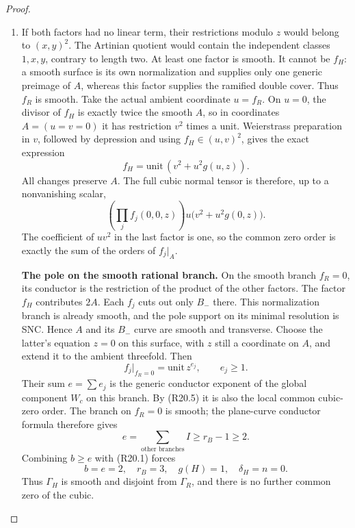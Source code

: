 \begin{proof}
\begin{enumerate}[label={$\langle1\rangle$\arabic*.},leftmargin=*]
\item If both factors had no linear term, their
restrictions modulo $z$ would belong to
$(x,y)^2$. The Artinian quotient would contain
the independent classes $1,x,y$, contrary to
length two. At least one factor is smooth.
It cannot be $f_H$: a smooth surface is its own
normalization and supplies only one generic
preimage of $A$, whereas this factor supplies
the ramified double cover. Thus $f_R$ is smooth.
Take the actual ambient coordinate $u=f_R$.
On $u=0$, the divisor of $f_H$ is exactly twice
the smooth $A$, so in coordinates
$A=(u=v=0)$ it has restriction $v^2$ times a
unit. Weierstrass preparation in $v$, followed
by depression and using $f_H\in(u,v)^2$, gives
the exact expression
\[
                    f_H=\text{unit}\,(v^2+u^2g(u,z)).     \tag{R20.4}
\]
All changes preserve $A$. The full cubic normal
tensor is therefore, up to a nonvanishing scalar,
\[
        \left(\prod_j f_j(0,0,z)\right)
                     u\bigl(v^2+u^2g(0,z)\bigr).          \tag{R20.5}
\]
The coefficient of $uv^2$ in the last factor is
one, so the common zero order is exactly the
sum of the orders of $f_j|_A$.

\par\medskip\noindent\textbf{The pole on the smooth rational branch.}
On the smooth branch $f_R=0$, its conductor is
the restriction of the product of the other
factors. The factor $f_H$ contributes $2A$.
Each $f_j$ cuts out only $B_-$ there. This
normalization branch is already smooth, and
the pole support on its minimal resolution is
SNC. Hence $A$ and its $B_-$ curve are smooth
and transverse. Choose the latter's equation
$z=0$ on this surface, with $z$ still a
coordinate on $A$, and extend it to the ambient
threefold. Then
\[
             f_j|_{f_R=0}=\text{unit}\,z^{e_j},
                  \qquad e_j\ge1.
\]
Their sum $e=\sum e_j$ is the generic conductor
exponent of the global component $W_c$ on
this branch. By (R20.5) it is also the local
common cubic-zero order. The branch on
$f_R=0$ is smooth; the plane-curve conductor
formula therefore gives
\[
          e=\sum_{\text{other branches}}I
                         \ge r_B-1\ge2.
\]
Combining $b\ge e$ with (R20.1) forces
\[
     b=e=2,\quad r_B=3,\quad
     g(H)=1,\quad \delta_H=n=0.                         \tag{R20.6}
\]
Thus $\Gamma_H$ is smooth and disjoint from
$\Gamma_R$, and there is no further common
zero of the cubic.


\end{enumerate}
\end{proof}
